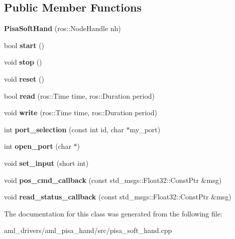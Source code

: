 \subsection*{Public Member Functions}
\begin{DoxyCompactItemize}
\item 
\hypertarget{class_pisa_soft_hand_a7d538758c22f8c000a6d5a939c640ed1}{}\label{class_pisa_soft_hand_a7d538758c22f8c000a6d5a939c640ed1} 
{\bfseries Pisa\+Soft\+Hand} (ros\+::\+Node\+Handle nh)
\item 
\hypertarget{class_pisa_soft_hand_aad2a5de4ca5080dce5477e13a0c1d6c7}{}\label{class_pisa_soft_hand_aad2a5de4ca5080dce5477e13a0c1d6c7} 
bool {\bfseries start} ()
\item 
\hypertarget{class_pisa_soft_hand_a43c234b45370dc282a10a90fe0e385ef}{}\label{class_pisa_soft_hand_a43c234b45370dc282a10a90fe0e385ef} 
void {\bfseries stop} ()
\item 
\hypertarget{class_pisa_soft_hand_a57682f3ab8d6e51ae34a22a75291388e}{}\label{class_pisa_soft_hand_a57682f3ab8d6e51ae34a22a75291388e} 
void {\bfseries reset} ()
\item 
\hypertarget{class_pisa_soft_hand_abf15b90fbe7646e26fd0f579806f5b01}{}\label{class_pisa_soft_hand_abf15b90fbe7646e26fd0f579806f5b01} 
bool {\bfseries read} (ros\+::\+Time time, ros\+::\+Duration period)
\item 
\hypertarget{class_pisa_soft_hand_ae0360f0996a1bc761b3e064bbedc755f}{}\label{class_pisa_soft_hand_ae0360f0996a1bc761b3e064bbedc755f} 
void {\bfseries write} (ros\+::\+Time time, ros\+::\+Duration period)
\item 
\hypertarget{class_pisa_soft_hand_adc94442a6cc1252beb7193ef442f7824}{}\label{class_pisa_soft_hand_adc94442a6cc1252beb7193ef442f7824} 
int {\bfseries port\+\_\+selection} (const int id, char $\ast$my\+\_\+port)
\item 
\hypertarget{class_pisa_soft_hand_a8b43f4c15cef48dfe688069d9f025669}{}\label{class_pisa_soft_hand_a8b43f4c15cef48dfe688069d9f025669} 
int {\bfseries open\+\_\+port} (char $\ast$)
\item 
\hypertarget{class_pisa_soft_hand_a012696951e4c570f58a8026e58fef83d}{}\label{class_pisa_soft_hand_a012696951e4c570f58a8026e58fef83d} 
void {\bfseries set\+\_\+input} (short int)
\item 
\hypertarget{class_pisa_soft_hand_afece44618b89e2c0553a206a0729b03e}{}\label{class_pisa_soft_hand_afece44618b89e2c0553a206a0729b03e} 
void {\bfseries pos\+\_\+cmd\+\_\+callback} (const std\+\_\+msgs\+::\+Float32\+::\+Const\+Ptr \&msg)
\item 
\hypertarget{class_pisa_soft_hand_afe62272619863f9e7194336f1eb58b22}{}\label{class_pisa_soft_hand_afe62272619863f9e7194336f1eb58b22} 
void {\bfseries read\+\_\+status\+\_\+callback} (const std\+\_\+msgs\+::\+Float32\+::\+Const\+Ptr \&msg)
\end{DoxyCompactItemize}


The documentation for this class was generated from the following file\+:\begin{DoxyCompactItemize}
\item 
aml\+\_\+drivers/aml\+\_\+pisa\+\_\+hand/src/pisa\+\_\+soft\+\_\+hand.\+cpp\end{DoxyCompactItemize}
